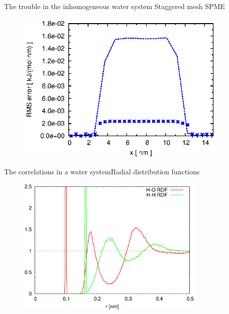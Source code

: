\documentclass{beamer}
\begin{document}
\begin{frame}{The trouble in the inhomogeneous water system}
  {Staggered mesh SPME}
  \begin{figure}
    \centering
    \includegraphics[width=0.9\textwidth]{figs/long-range-inhomo/water-st-error-1.eps}
  \end{figure}  
\end{frame}

\begin{frame}{The correlations in a water system}{Radial distribution functions}
  \begin{figure}
    \centering
    \includegraphics[width=0.8\textwidth]{figs/long-range-nna/rdf-corr-h2o-0.eps}
  \end{figure}
\end{frame}
\end{document}
